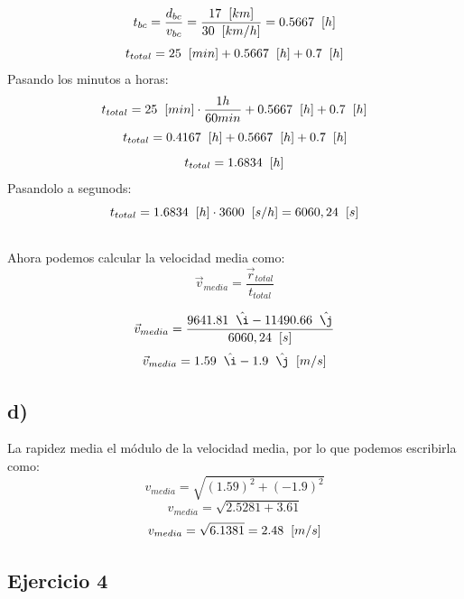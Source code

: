 \documentclass[
  letterpaper,
  DIV=11,
  numbers=noendperiod]{scrartcl}
\begin{document}
\subsection{}\label{section-4}

\[
t_{bc} = \frac{d_{bc}}{v_{bc}} = \frac{17 \hspace{0.2cm} [km]}{30 \hspace{0.2cm} [km/h]} = 0.5667 \hspace{0.2cm} [h]
\] \[
t_{total} = 25 \hspace{0.2cm} [min] + 0.5667 \hspace{0.2cm} [h] + 0.7 \hspace{0.2cm} [h]
\] Pasando los minutos a horas: \[
t_{total} = 25 \hspace{0.2cm} [min] \cdot \frac{1 h}{60 min} + 0.5667 \hspace{0.2cm} [h] + 0.7 \hspace{0.2cm} [h]
\] \[
t_{total} = 0.4167 \hspace{0.2cm} [h] + 0.5667 \hspace{0.2cm} [h] + 0.7 \hspace{0.2cm} [h]
\] \[
t_{total} = 1.6834 \hspace{0.2cm} [h]
\] Pasandolo a segunods: \[
t_{total} = 1.6834 \hspace{0.2cm} [h] \cdot 3600 \hspace{0.2cm} [s/h] = 6060,24 \hspace{0.2cm} [s]
\]

\subsection{}\label{section-5}

Ahora podemos calcular la velocidad media como: \[
\vec{v}_{media} = \frac{\vec{r}_{total}}{t_{total}}
\]

\[
\vec{v}_{media} = \frac{9641.81 \hspace{0.2cm} \hat{ı} - 11490.66 \hspace{0.2cm} \hat{ȷ}}{6060,24 \hspace{0.2cm} [s]}
\] \[
\vec{v}_{media} = 1.59 \hspace{0.2cm} \hat{ı} - 1.9 \hspace{0.2cm} \hat{ȷ} \hspace{0.2cm} [m/s]
\]

\subsection{d)}\label{d}

La rapidez media el módulo de la velocidad media, por lo que podemos
escribirla como: \[
v_{media} = \sqrt{(1.59)^2 + (-1.9)^2}
\] \[
v_{media} = \sqrt{2.5281 + 3.61}
\] \[
v_{media} = \sqrt{6.1381} = 2.48 \hspace{0.2cm} [m/s]
\]

\subsection{Ejercicio 4}\label{ejercicio-4}
\end{document}
